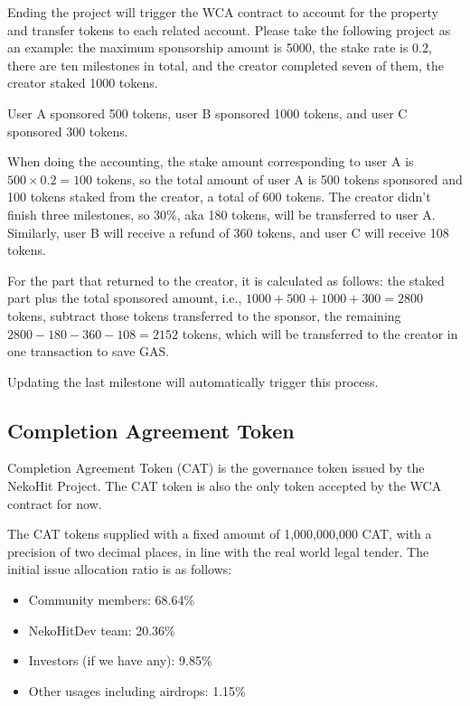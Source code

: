 \documentclass[12pt,a4paper]{article}
\begin{document}
    Ending the project will trigger the WCA contract to account for the property
    and transfer tokens to each related account.
    Please take the following project as an example: the maximum sponsorship amount
    is 5000, the stake rate is 0.2, there are ten milestones in total, and the
    creator completed seven of them, the creator staked 1000 tokens.

    User A sponsored 500 tokens, user B sponsored 1000 tokens, and user C sponsored
    300 tokens.

    When doing the accounting, the stake amount corresponding to user A is
    $500 \times 0.2 = 100$ tokens, so the total amount of user A is 500 tokens
    sponsored and 100 tokens staked from the creator, a total of 600 tokens.
    The creator didn't finish three milestones, so 30\%, aka 180 tokens, will be
    transferred to user A.
    Similarly, user B will receive a refund of 360 tokens, and user C will receive
    108 tokens.

    For the part that returned to the creator, it is calculated as follows: the
    staked part plus the total sponsored amount, i.e.,
    $1000 + 500 + 1000 + 300 = 2800$ tokens, subtract those tokens transferred
    to the sponsor, the remaining $2800 - 180 - 360 - 108 = 2152$ tokens, which
    will be transferred to the creator in one transaction to save GAS.

    Updating the last milestone will automatically trigger this process.

    \subsection{Completion Agreement Token}\label{subsec:cat}

    Completion Agreement Token (CAT) is the governance token issued by the NekoHit
    Project.
    The CAT token is also the only token accepted by the WCA contract for now.

    The CAT tokens supplied with a fixed amount of 1,000,000,000 CAT, with a
    precision of two decimal places, in line with the real world legal tender.
    The initial issue allocation ratio is as follows:

    \begin{itemize}
        \item Community members: 68.64\%
        \item NekoHitDev team: 20.36\%
        \item Investors (if we have any): 9.85\%
        \item Other usages including airdrops: 1.15\%
    \end{itemize}
\end{document}
